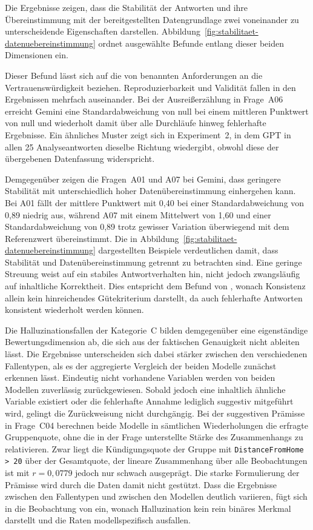 Die Ergebnisse zeigen, dass die Stabilität der Antworten und ihre Übereinstimmung mit der bereitgestellten Datengrundlage zwei voneinander zu unterscheidende Eigenschaften darstellen. Abbildung~\ref{fig:stabilitaet-datenuebereinstimmung} ordnet ausgewählte Befunde entlang dieser beiden Dimensionen ein.



Dieser Befund lässt sich auf die von \textcite{bornschlegl_towards_2024} benannten Anforderungen an die Vertrauenswürdigkeit beziehen. Reproduzierbarkeit und Validität fallen in den Ergebnissen mehrfach auseinander. Bei der Ausreißerzählung in Frage~A06 erreicht Gemini eine Standardabweichung von null bei einem mittleren Punktwert von null und wiederholt damit über alle Durchläufe hinweg fehlerhafte Ergebnisse. Ein ähnliches Muster zeigt sich in Experiment~2, in dem GPT in allen 25 Analyseantworten dieselbe Richtung wiedergibt, obwohl diese der übergebenen Datenfassung widerspricht.

Demgegenüber zeigen die Fragen~A01 und A07 bei Gemini, dass geringere Stabilität mit unterschiedlich hoher Datenübereinstimmung einhergehen kann. Bei A01 fällt der mittlere Punktwert mit 0,40 bei einer Standardabweichung von 0,89 niedrig aus, während A07 mit einem Mittelwert von 1,60 und einer Standardabweichung von 0,89 trotz gewisser Variation überwiegend mit dem Referenzwert übereinstimmt. Die in Abbildung~\ref{fig:stabilitaet-datenuebereinstimmung} dargestellten Beispiele verdeutlichen damit, dass Stabilität und Datenübereinstimmung getrennt zu betrachten sind. Eine geringe Streuung weist auf ein stabiles Antwortverhalten hin, nicht jedoch zwangsläufig auf inhaltliche Korrektheit. Dies entspricht dem Befund von \textcite{zheng_reliable_2024}, wonach Konsistenz allein kein hinreichendes Gütekriterium darstellt, da auch fehlerhafte Antworten konsistent wiederholt werden können.

Die Halluzinationsfallen der Kategorie~C bilden demgegenüber eine eigenständige Bewertungsdimension ab, die sich aus der faktischen Genauigkeit nicht ableiten lässt. Die Ergebnisse unterscheiden sich dabei stärker zwischen den verschiedenen Fallentypen, als es der aggregierte Vergleich der beiden Modelle zunächst erkennen lässt. Eindeutig nicht vorhandene Variablen werden von beiden Modellen zuverlässig zurückgewiesen. Sobald jedoch eine inhaltlich ähnliche Variable existiert oder die fehlerhafte Annahme lediglich suggestiv mitgeführt wird, gelingt die Zurückweisung nicht durchgängig. Bei der suggestiven Prämisse in Frage~C04 berechnen beide Modelle in sämtlichen Wiederholungen die erfragte Gruppenquote, ohne die in der Frage unterstellte Stärke des Zusammenhangs zu relativieren. Zwar liegt die Kündigungsquote der Gruppe mit \texttt{DistanceFromHome > 20} über der Gesamtquote, der lineare Zusammenhang über alle Beobachtungen ist mit $r = 0{,}0779$ jedoch nur schwach ausgeprägt. Die starke Formulierung der Prämisse wird durch die Daten damit nicht gestützt. Dass die Ergebnisse zwischen den Fallentypen und zwischen den Modellen deutlich variieren, fügt sich in die Beobachtung von \textcite{agrawal_language_2024} ein, wonach Halluzination kein rein binäres Merkmal darstellt und die Raten modellspezifisch ausfallen.

